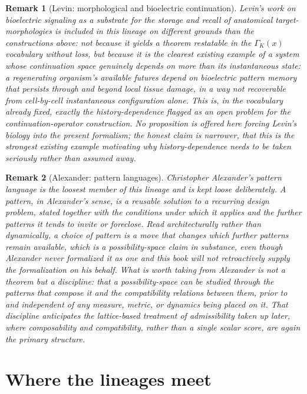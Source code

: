 \documentclass[11pt]{report}
\newtheorem{remark}{Remark}[chapter]
\begin{document}
\begin{remark}[Levin: morphological and bioelectric continuation]
Levin's work on bioelectric signaling as a substrate for the storage and
recall of anatomical target-morphologies \cite{levin2021} is included in
this lineage on different grounds than the constructions above: not
because it yields a theorem restatable in the $\Gamma_K(x)$ vocabulary
without loss, but because it is the clearest existing example of a
system whose continuation space genuinely depends on more than its
instantaneous state: a regenerating organism's available futures
depend on bioelectric pattern memory that persists through and beyond
local tissue damage, in a way not recoverable from cell-by-cell
instantaneous configuration alone. This is, in the vocabulary already
fixed, exactly the history-dependence flagged as an open problem for the
continuation-operator construction. No proposition is offered here
forcing Levin's biology into the present formalism; the honest claim is
narrower, that this is the strongest existing example motivating why
history-dependence needs to be taken seriously rather than assumed away.
\end{remark}

\begin{remark}[Alexander: pattern languages]
Christopher Alexander's pattern language \cite{alexander1977} is the
loosest member of this lineage and is kept loose deliberately. A
pattern, in Alexander's sense, is a reusable solution to a recurring
design problem, stated together with the conditions under which it
applies and the further patterns it tends to invite or foreclose. Read
architecturally rather than dynamically, a choice of pattern is a move
that changes which further patterns remain available, which is a
possibility-space claim in substance, even though Alexander never
formalized it as one and this book will not retroactively supply the
formalization on his behalf. What is worth taking from Alexander is not
a theorem but a discipline: that a possibility-space can be studied
through the patterns that compose it and the compatibility relations
between them, prior to and independent of any measure, metric, or
dynamics being placed on it. That discipline anticipates the
lattice-based treatment of admissibility taken up later, where
composability and compatibility, rather than a single scalar score, are
again the primary structure.
\end{remark}

\section*{Where the lineages meet}
\end{document}
